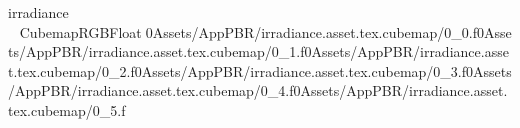 
   irradiance                 CubemapRGBFloat   0   Assets/AppPBR/irradiance.asset.tex.cubemap/0_0.f0   Assets/AppPBR/irradiance.asset.tex.cubemap/0_1.f0   Assets/AppPBR/irradiance.asset.tex.cubemap/0_2.f0   Assets/AppPBR/irradiance.asset.tex.cubemap/0_3.f0   Assets/AppPBR/irradiance.asset.tex.cubemap/0_4.f0   Assets/AppPBR/irradiance.asset.tex.cubemap/0_5.f